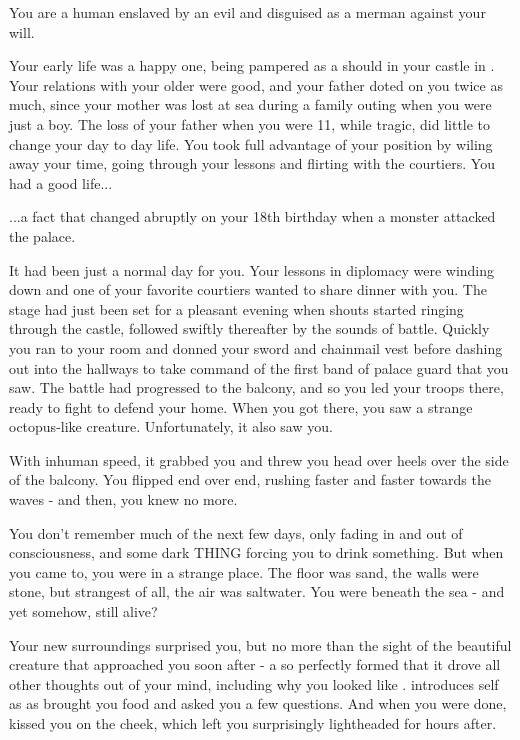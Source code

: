 \documentclass[char]{NeptuneBall}
\begin{document}
\name{\cSlave{}}


You are a human \cSlave{\Prince} enslaved by an evil \cWitch{\magician} and disguised as a merman against your will.

Your early life was a happy one, being pampered as a \cSlave{\Prince} should in your castle in \pAmerica{}. Your relations with your older \cEric{\sibling} were good, and your father doted on you twice as much, since your mother was lost at sea during a family outing when you were just a boy. The loss of your father when you were 11, while tragic, did little to change your day to day life. You took full advantage of your position by wiling away your time, going through your lessons and flirting with the courtiers. You had a good life...

...a fact that changed abruptly on your 18th birthday when a monster attacked the palace.

It had been just a normal day for you. Your lessons in diplomacy were winding down and one of your favorite courtiers wanted to share dinner with you. The stage had just been set for a pleasant evening when shouts started ringing through the castle, followed swiftly thereafter by the sounds of battle. Quickly you ran to your room and donned your sword and chainmail vest before dashing out into the hallways to take command of the first band of palace guard that you saw. The battle had progressed to the balcony, and so you led your troops there, ready to fight to defend your home. When you got there, you saw a strange octopus-like creature. Unfortunately, it also saw you.

With inhuman speed, it grabbed you and threw you head over heels over the side of the balcony. You flipped end over end, rushing faster and faster towards the waves - and then, you knew no more.

You don't remember much of the next few days, only fading in and out of consciousness, and some dark THING forcing you to drink something. But when you came to, you were in a strange place. The floor was sand, the walls were stone, but strangest of all, the air was saltwater. You were beneath the sea - and yet somehow, still alive?

Your new surroundings surprised you, but no more than the sight of the beautiful creature that approached you soon after - a \cWitch{\mer} so perfectly formed that it drove all other thoughts out of your mind, including why you looked like \cWitch{\them}. \cWitch{\They} introduces \cWitch{\their}self as \cWitch{} as \cWitch{\they} brought you food and asked you a few questions. And when you were done, \cWitch{\they} kissed you on the cheek, which left you surprisingly lightheaded for hours after.
\end{document}
